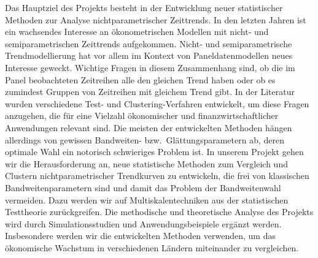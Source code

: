 \documentclass[a4paper,12pt]{article}
\begin{document}
Das Hauptziel des Projekts besteht in der Entwicklung neuer statistischer Methoden zur Analyse nichtparametrischer Zeittrends. In den letzten Jahren ist ein wachsendes Interesse an \"okonometrischen Modellen mit nicht- und semiparametrischen Zeittrends aufgekommen. Nicht- und semiparametrische Trendmodellierung hat vor allem im Kontext von Paneldatenmodellen neues Interesse geweckt. 
Wichtige Fragen in diesem Zusammenhang sind, ob die im Panel beobachteten Zeitreihen alle den gleichen Trend haben oder ob es zumindest Gruppen von Zeitreihen mit gleichem Trend gibt. In der Literatur wurden verschiedene Test- und Clustering-Verfahren entwickelt, um diese Fragen anzugehen, die f\"ur eine Vielzahl \"okonomischer und finanzwirtschaftlicher Anwendungen relevant sind. Die meisten der entwickelten Methoden h\"angen allerdings von gewissen Bandweiten- bzw.\ Gl\"attungsparametern ab, deren optimale Wahl ein notorisch schwieriges Problem ist. In unserem Projekt gehen wir die Herausforderung an, neue statistische Methoden zum Vergleich und Clustern nichtparametrischer Trendkurven zu entwickeln, die frei von klassischen Bandweitenparametern sind und damit das Problem der Bandweitenwahl vermeiden. Dazu werden wir auf Multiskalentechniken aus der statistischen Testtheorie zur\"uckgreifen. Die methodische und theoretische Analyse des Projekts wird durch Simulationsstudien und Anwendungsbeispiele erg\"anzt werden. Insbesondere werden wir die entwickelten Methoden verwenden, um das \"okonomische Wachstum in verschiedenen L\"andern miteinander zu vergleichen. 
\end{document}
